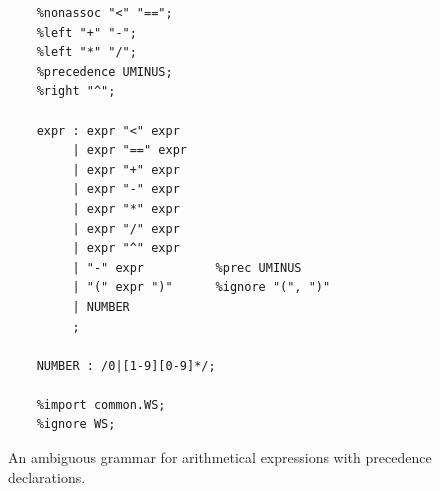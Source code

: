 \begin{figure}[!ht]
\centering
\begin{verbatim}
    %nonassoc "<" "==";
    %left "+" "-";
    %left "*" "/";
    %precedence UMINUS;
    %right "^";

    expr : expr "<" expr
         | expr "==" expr
         | expr "+" expr
         | expr "-" expr
         | expr "*" expr
         | expr "/" expr
         | expr "^" expr
         | "-" expr          %prec UMINUS
         | "(" expr ")"      %ignore "(", ")"
         | NUMBER
         ;

    NUMBER : /0|[1-9][0-9]*/;

    %import common.WS;
    %ignore WS;
\end{verbatim}
\vspace*{-0.3cm}
\caption{An ambiguous grammar for arithmetical expressions with precedence declarations.}
\label{fig:Precedence-Declarations.ipynb}
\end{figure}
\FloatBarrier

